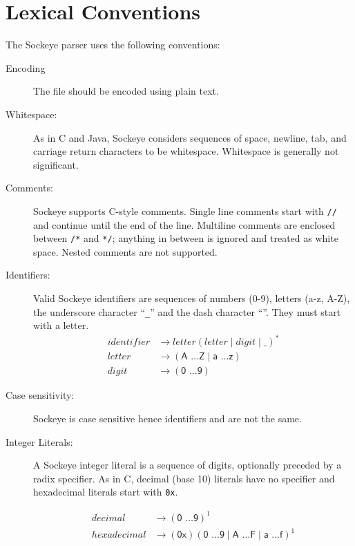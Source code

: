 \documentclass[a4paper,11pt,twoside]{report}
\begin{document}
{{{%
\chapter{Lexical Conventions}
\label{chap:lexer}

The Sockeye parser uses the following conventions:

\begin{description}
\item[Encoding] The file should be encoded using plain text.
\item[Whitespace:]  As in C and Java, Sockeye considers sequences of
  space, newline, tab, and carriage return characters to be
  whitespace.  Whitespace is generally not significant. 

\item[Comments:] Sockeye supports C-style comments.  Single line comments
  start with \texttt{//} and continue until the end of the line.
  Multiline comments are enclosed between \texttt{/*} and \texttt{*/};
  anything in between is ignored and treated as white space.
  Nested comments are not supported.

\item[Identifiers:] Valid Sockeye identifiers are sequences of numbers
  (0-9), letters (a-z, A-Z), the underscore character ``\texttt{\_}'' and the dash character ``\textendash''. They
  must start with a letter.
  \begin{align*}
  identifier & \rightarrow letter (letter \mid digit \mid \text{\_})^{\textrm{*}} \\
  letter & \rightarrow (\textsf{A \ldots Z} \mid  \textsf{a \ldots z})\\
  digit & \rightarrow (\textsf{0 \ldots 9})
    \end{align*}

\item[Case sensitivity:] Sockeye is case sensitive hence identifiers  and  are not the same.
  
\item[Integer Literals:] A Sockeye integer literal is a sequence of
  digits, optionally preceded by a radix specifier.  As in C, decimal (base 10)
  literals have no specifier and hexadecimal literals start with
  \texttt{0x}.

\begin{align*}
decimal & \rightarrow (\textsf{0 \ldots 9})^{\textrm{1}}\\
hexadecimal & \rightarrow (\textsf{0x})(\textsf{0 \ldots 9} \mid \textsf{A \ldots F} \mid \textsf{a \ldots f})^{\textrm{1}}\\
\end{align*}


\end{description}}}}
\end{document}
